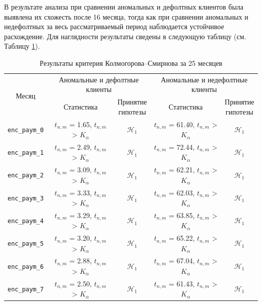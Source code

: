 В результате анализа при сравнении аномальных и дефолтных клиентов была выявлена их схожесть после 16 месяца, тогда как при сравнении аномальных и недефолтных за весь рассматриваемый период наблюдается устойчивое расхождение. Для наглядности результаты сведены в следующую таблицу (см. Таблицу \ref{tab:ks_enc_paym}).

\begin{table}[H]
	\centering
	\caption{Результаты критерия Колмогорова--Смирнова за 25 месяцев}
	\label{tab:ks_enc_paym}
	\begin{tabular}{|c|c|c|c|c|}
		\hline
		\multirow{2}{*}{Месяц} &
		\multicolumn{2}{c|}{Аномальные и дефолтные клиенты} &
		\multicolumn{2}{c|}{Аномальные и недефолтные клиенты} \\
		\cline{2-5}
		& Статистика & \specialcell{Принятие\\гипотезы} & Статистика & \specialcell{Принятие\\гипотезы} \\
		\hline
		\texttt{enc\_paym\_0} & $t_{n,m}$ = 1.65, $t_{n,m}$ > $K_\alpha$ & $\mathcal{H}_1$  & $t_{n,m}$ = 61.40, $t_{n,m}$ > $K_\alpha$ & $\mathcal{H}_1$ \\ \hline
		\texttt{enc\_paym\_1}  & $t_{n,m}$ = 2.49, $t_{n,m}$ > $K_\alpha$ & $\mathcal{H}_1$  & $t_{n,m}$ = 72.44, $t_{n,m}$ > $K_\alpha$ & $\mathcal{H}_1$ \\ \hline
		\texttt{enc\_paym\_2}  & $t_{n,m}$ = 3.09, $t_{n,m}$ > $K_\alpha$ & $\mathcal{H}_1$  & $t_{n,m}$ = 62.21, $t_{n,m}$ > $K_\alpha$ & $\mathcal{H}_1$ \\ \hline
		\texttt{enc\_paym\_3}  & $t_{n,m}$ = 3.33, $t_{n,m}$ > $K_\alpha$ & $\mathcal{H}_1$  & $t_{n,m}$ = 62.03, $t_{n,m}$ > $K_\alpha$ & $\mathcal{H}_1$ \\ \hline
		\texttt{enc\_paym\_4}  & $t_{n,m}$ = 3.29, $t_{n,m}$ > $K_\alpha$ & $\mathcal{H}_1$  & $t_{n,m}$ = 63.85, $t_{n,m}$ > $K_\alpha$ & $\mathcal{H}_1$ \\ \hline
		\texttt{enc\_paym\_5}  & $t_{n,m}$ = 3.20, $t_{n,m}$ > $K_\alpha$ & $\mathcal{H}_1$  & $t_{n,m}$ = 65.22, $t_{n,m}$ > $K_\alpha$ & $\mathcal{H}_1$ \\ \hline
		\texttt{enc\_paym\_6}  & $t_{n,m}$ = 2.88, $t_{n,m}$ > $K_\alpha$ & $\mathcal{H}_1$  & $t_{n,m}$ = 67.04, $t_{n,m}$ > $K_\alpha$ & $\mathcal{H}_1$ \\ \hline
		\texttt{enc\_paym\_7}  & $t_{n,m}$ = 2.50, $t_{n,m}$ > $K_\alpha$ & $\mathcal{H}_1$  & $t_{n,m}$ = 61.43, $t_{n,m}$ > $K_\alpha$ & $\mathcal{H}_1$ \\ \hline

\end{tabular}
\end{table}
